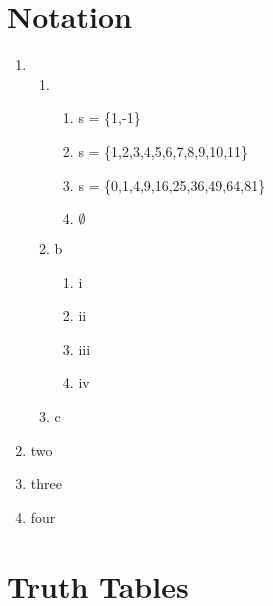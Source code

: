 \documentclass[11pt]{article}
\begin{document}
\section*{Notation}
\begin{enumerate}
\item
\begin{enumerate}
\item
\begin{enumerate}
\item s = \{1,-1\}
\item s = \{1,2,3,4,5,6,7,8,9,10,11\}
\item s = \{0,1,4,9,16,25,36,49,64,81\}
\item $\emptyset$
\end{enumerate}

\item b
\begin{enumerate}
\item i
\item ii
\item iii
\item iv
\end{enumerate}

\item c
\end{enumerate}

\item two
\item three
\item four


\end{enumerate}

\section*{Truth Tables}
\end{document}

